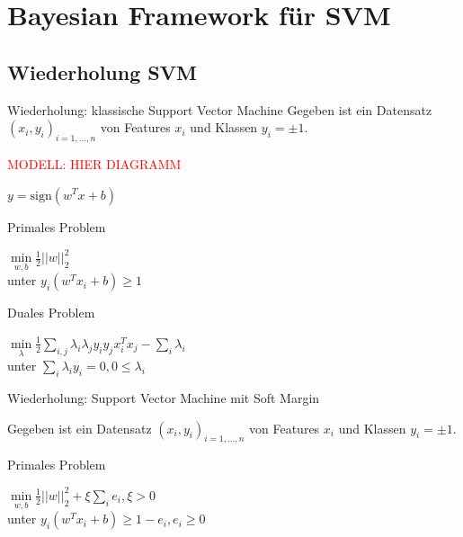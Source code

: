 \documentclass{beamer}
\begin{document}
{\section{Bayesian Framework für SVM}

\frame{\tableofcontents[currentsection,subsectionstyle=show/shaded,hideothersubsections]}

\subsection{Wiederholung SVM}

\begin{frame}{Wiederholung: klassische Support Vector Machine}
Gegeben ist ein Datensatz $(x_i,y_i)_{i=1,...,n}$ von Features $x_i$ und Klassen $y_i = \pm 1$.

\textcolor{red}{MODELL: HIER DIAGRAMM}

$y = \text{sign}(w^T x + b)$


\begin{block}{Primales Problem}
	\begin{center}
	$ \underset{w, b}{\min} \frac{1}{2}\vert \vert w \vert \vert ^2_2$\\
	unter $ y_i(w^T x_i + b) \geq 1$
	\end{center}
\end{block}


\begin{block}{Duales Problem}
	\begin{center}
	$\underset{\lambda}{\min} \frac{1}{2}\underset{i,j}{\sum} \lambda_i \lambda_j y_i y_j x_i^T x_j - \underset{i}{\sum}\lambda_i$ \\
	unter $\underset{i}{\sum}\lambda_i y_i = 0, 0 \leq \lambda_i $
	\end{center}
\end{block}

\end{frame}

\begin{frame}{Wiederholung: Support Vector Machine mit Soft Margin}

Gegeben ist ein Datensatz $(x_i,y_i)_{i=1,...,n}$ von Features $x_i$ und Klassen $y_i = \pm 1$.


\begin{block}{Primales Problem}
	\begin{center}
	$ \underset{w, b}{\min} \frac{1}{2}\vert \vert w \vert \vert ^2_2 + \xi \underset{i}{\sum}e_i, \xi > 0$\\
	unter $ y_i(w^T x_i + b) \geq 1 - e_i, e_i \geq 0$
	\end{center}
\end{block}



\end{frame}}
\end{document}

